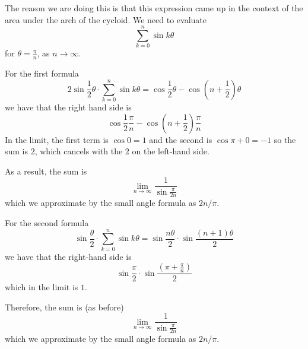 \documentclass[11pt, oneside]{article}
\begin{document}
The reason we are doing this is that this expression came up in the context of the area under the arch of the cycloid.  We need to evaluate 
\[ \sum_{k=0}^n \sin k \theta \]
for $\theta = \frac \pi n$, as $n \rightarrow \infty$.

For the first formula
\[ 2 \sin {\frac 1 2} \theta  \cdot \sum_{k=0}^n \sin k \theta = \cos {\frac 1 2} \theta  - \cos (n +  {\frac 1 2}) \theta \]
we have that the right hand side is
\[ \cos {\frac 1 2} \frac \pi n  - \cos (n +  {\frac 1 2}) \frac \pi n \]
In the limit, the first term is $\cos 0 = 1$ and the second is $\cos \pi + 0 = - 1$ so the sum is $2$, which cancels with the $2$ on the left-hand side.  

As a result, the sum is
\[ \lim_{n \rightarrow \infty} \frac 1 {\sin \frac \pi {2n}} \]
which we approximate by the small angle formula as $2n/\pi$.

For the second formula
\[ \sin \frac \theta 2 \cdot \sum_{k=0}^n \sin k \theta =  \sin \frac {n \theta} 2 \cdot \sin \frac {(n+1) \theta} 2  \]
we have that the right-hand side is
\[ \sin \frac \pi 2 \cdot \sin \frac {(\pi + \frac \pi n)} 2 \]
which in the limit is $1$.

Therefore, the sum is (as before)
\[ \lim_{n \rightarrow \infty} \frac 1 {\sin \frac \pi {2n}} \]
which we approximate by the small angle formula as $2n/\pi$.
\end{document}
